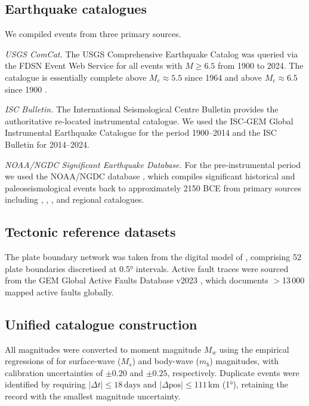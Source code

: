 \documentclass[draft]{agujournal2019}
\begin{document}
\subsection{Earthquake catalogues}

We compiled events from three primary sources.

\textit{USGS ComCat.}  The USGS Comprehensive Earthquake Catalog
\citep{USGS2024} was queried via the FDSN Event Web Service for all events
with $M \geq 6.5$ from 1900 to 2024.  The catalogue is essentially complete
above $M_c \approx 5.5$ since 1964 and above $M_c \approx 6.5$ since 1900
\citep{Engdahl2002}.

\textit{ISC Bulletin.}  The International Seismological Centre Bulletin
\citep{ISC2023} provides the authoritative re-located instrumental catalogue.
We used the ISC-GEM Global Instrumental Earthquake Catalogue \citep{Storchak2013}
for the period 1900–2014 and the ISC Bulletin for 2014–2024.

\textit{NOAA/NGDC Significant Earthquake Database.}  For the pre-instrumental
period we used the NOAA/NGDC database \citep{NOAA2024}, which compiles
significant historical and paleoseismological events back to approximately
2150 BCE from primary sources including \citet{Ambraseys1994},
\citet{Guidoboni2005}, \citet{Albini2013}, and regional catalogues.

\subsection{Tectonic reference datasets}

The plate boundary network was taken from the digital model of \citet{Bird2003},
comprising 52 plate boundaries discretised at 0.5° intervals.  Active fault
traces were sourced from the GEM Global Active Faults Database v2023
\citep{Styron2020}, which documents $>$13\,000 mapped active faults globally.

\subsection{Unified catalogue construction}

All magnitudes were converted to moment magnitude $M_w$ using the empirical
regressions of \citet{Scordilis2006} for surface-wave ($M_s$) and body-wave
($m_b$) magnitudes, with calibration uncertainties of $\pm 0.20$ and
$\pm 0.25$, respectively.  Duplicate events were identified by requiring
$|\Delta t| \leq 18\,\text{days}$ and $|\Delta \text{pos}| \leq 111\,\text{km}$
(1°), retaining the record with the smallest magnitude uncertainty.
\end{document}
